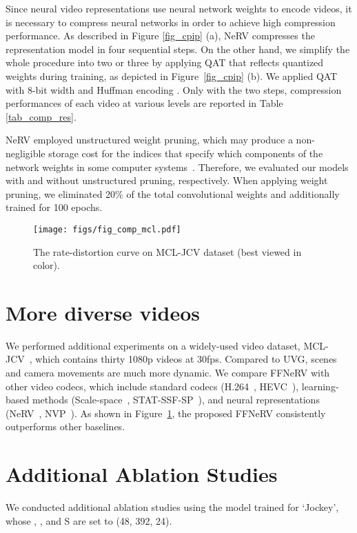 \documentclass[sigconf]{acmart}
\begin{document}
Since neural video representations use neural network weights to encode videos, it is necessary to compress neural networks in order to achieve high compression performance.
As described in Figure \ref{fig_cpip} (a), NeRV compresses the representation model in four sequential steps.
On the other hand, we simplify the whole procedure into two or three by applying QAT that reflects quantized weights during training, as depicted in Figure~\ref{fig_cpip} (b).
We applied QAT with 8-bit width and Huffman encoding  \cite{huffman}. Only with the two steps, compression performances of each video at various levels are reported in Table \ref{tab_comp_res}.

NeRV employed unstructured weight pruning, which may produce a non-negligible storage cost for the indices that specify which components of the network weights in some computer systems~\cite{weiprune}.
Therefore, we evaluated our models with and without unstructured pruning, respectively.
When applying weight pruning, we eliminated 20\% of the total convolutional weights and additionally trained for 100 epochs.



\begin{figure}[ht]
\begin{center}
\texttt{[image: figs/fig\_comp\_mcl.pdf]}
\end{center}
   \caption{The rate-distortion curve on MCL-JCV dataset (best viewed in color).}
\label{fig_comp_mcl}
\end{figure}

\section{More diverse videos}
We performed additional experiments on a widely-used video dataset, MCL-JCV~\cite{mcl}, which contains thirty 1080p videos at 30fps. 
Compared to UVG, scenes and camera movements are much more dynamic.
We compare FFNeRV with other video codecs, which include standard codecs (H.264~\cite{h264}, HEVC~\cite{hevc}), learning-based methods (Scale-space~\cite{scalespace}, STAT-SSF-SP~\cite{statssfsp}), and neural representations (NeRV~\cite{nerv}, NVP~\cite{scalable}).
As shown in Figure~\ref{fig_comp_mcl}, the proposed FFNeRV consistently outperforms other baselines.


\section{Additional Ablation Studies}
We conducted additional ablation studies using the model trained for `Jockey', whose , , and S are set to (48, 392, 24).
\end{document}
